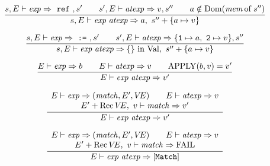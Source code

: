 \begin{equation}	%
\label{refapp-dyn-rule}
\frac{\s,\E\ts\exp\ra~\ml{ref}~,\s'\qquad
      \s',\E\ts\atexp\ra\V,\s''\qquad
      \A\notin\Dom(\of{\mem}{\s''})}
     {\s,\E\ts\appexp\ra\A,\ \s''+\{\A\mapsto\V\} }
\end{equation}


\begin{equation}	%
\label{assapp-dyn-rule}
\frac{\s,\E\ts\exp\ra~\mbox{\tt :=}~,\s'\qquad
      \s',\E\ts\atexp\ra\{{\tt 1}\mapsto\A,\ {\tt 2}\mapsto\V\},\s''}
     {\s,\E\ts\appexp\ra\emptymap\ \In\ \Val,\ \s''+\{\A\mapsto\V\} }
\end{equation}

\begin{equation}	%
\frac{\E\ts\exp\ra b
      \qquad\E\ts\atexp\ra\V\qquad\APPLY(b,\V)=\V'}
     {\E\ts\appexp\ra\V'}\index{53.1}
\end{equation}

\begin{equation}	%
\label{closapp-dyn-rule}
\frac{\begin{array}{c}
      \E\ts\exp\ra(\match,\E',\VE)\qquad\E\ts\atexp\ra\V\\
      \E'+\Rec\VE,\ \V\ts\match\ra\V'
      \end{array}
     }
     {\E\ts\appexp\ra\V'}
\end{equation}

\begin{equation}        %
\label{closapp-dyn-rule1}
\frac{\begin{array}{c}
      \E\ts\exp\ra(\match,\E',\VE)\qquad\E\ts\atexp\ra\V\\
      \E'+\Rec\VE,\ \V\ts\match\ra\FAIL
      \end{array}
     }
     {\E\ts\appexp\ra[{\tt Match}]}
\end{equation}



